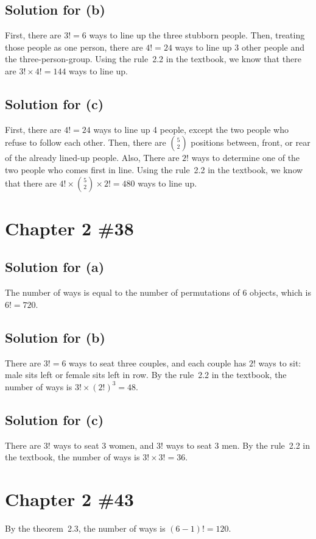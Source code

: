 \documentclass{scrartcl}
\begin{document}
\subsection{Solution for (b)}
First, there are \(3! = 6\) ways to line up the three stubborn people. Then,
treating those people as one person, there are \(4! = 24\) ways to line up 3
other people and the three-person-group. Using the rule~2.2 in the textbook,
we know that there are \(3! \times 4! = 144\) ways to line up.

\subsection{Solution for (c)}
First, there are \(4! = 24\) ways to line up 4 people, except the two people
who refuse to follow each other. Then, there are \(5 \choose 2\) positions
between, front, or rear of the already lined-up people. Also, There are \(2!\)
ways to determine one of the two people who comes first in line. Using the
rule~2.2 in the textbook, we know that there are
\(4! \times {5 \choose 2} \times 2! = 480\) ways to line up.

\section{Chapter 2 \#38}
\subsection{Solution for (a)}
The number of ways is equal to the number of permutations of 6 objects, which
is \(6! = 720\).

\subsection{Solution for (b)}
There are \(3! = 6\) ways to seat three couples, and each couple has \(2!\)
ways to sit: male sits left or female sits left in row. By the rule~2.2 in the
textbook, the number of ways is \(3! \times (2!)^3 = 48\).

\subsection{Solution for (c)}
There are \(3!\) ways to seat 3 women, and \(3!\) ways to seat 3 men. By the
rule~2.2 in the textbook, the number of ways is \(3! \times 3! = 36\).

\section{Chapter 2 \#43}
By the theorem~2.3, the number of ways is \((6 - 1)! = 120\).
\end{document}
